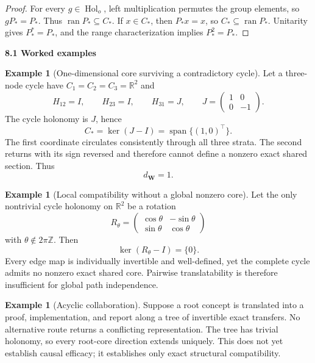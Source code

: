 \documentclass[11pt,letterpaper]{article}
\newcommand{\Workspace}{\mathbf W}
\newcommand{\Hol}{\operatorname{Hol}}
\newcommand{\subtopic}[1]{%
 \vspace{0.45em}
 {\bfseries\color{AccentColor} #1\par}
}
\theoremstyle{plain}
\theoremstyle{definition}
\newtheorem{example}[theorem]{Example}
\begin{document}
\begin{proof}
For every \(g\in\Hol_o\), left multiplication permutes the group elements, so
\(gP_*=P_*\). Thus \(\operatorname{ran}P_*\subseteq C_*\). If
\(x\in C_*\), then \(P_*x=x\), so \(C_*\subseteq\operatorname{ran}P_*\).
Unitarity gives \(P_*^*=P_*\), and the range characterization implies
\(P_*^2=P_*\).
\end{proof}

\subtopic{8.1 Worked examples}

\begin{example}[One-dimensional core surviving a contradictory cycle]\label{ex:reflection-cycle}
Let a three-node cycle have \(C_1=C_2=C_3=\mathbb R^2\) and
\[
H_{12}=I,
\qquad
H_{23}=I,
\qquad
H_{31}=J,
\qquad
J=
\begin{pmatrix}
1&0\\
0&-1
\end{pmatrix}.
\]
The cycle holonomy is \(J\), hence
\[
C_*=\ker(J-I)=\operatorname{span}\{(1,0)^\top\}.
\]
The first coordinate circulates consistently through all three strata. The
second returns with its sign reversed and therefore cannot define a nonzero
exact shared section. Thus
\[
d_{\Workspace}=1.
\]
\end{example}

\begin{example}[Local compatibility without a global nonzero core]\label{ex:rotation-obstruction}
Let the only nontrivial cycle holonomy on \(\mathbb R^2\) be a rotation
\[
R_\theta=
\begin{pmatrix}
\cos\theta&-\sin\theta\\
\sin\theta&\cos\theta
\end{pmatrix}
\]
with \(\theta\notin2\pi\mathbb Z\). Then
\[
\ker(R_\theta-I)=\{0\}.
\]
Every edge map is individually invertible and well-defined, yet the complete
cycle admits no nonzero exact shared core. Pairwise translatability is
therefore insufficient for global path independence.
\end{example}

\begin{example}[Acyclic collaboration]\label{ex:tree-workspace}
Suppose a root concept is translated into a proof, implementation, and report
along a tree of invertible exact transfers. No alternative route returns a
conflicting representation. The tree has trivial holonomy, so every root-core
direction extends uniquely. This does not yet establish causal efficacy; it
establishes only exact structural compatibility.
\end{example}
\end{document}
